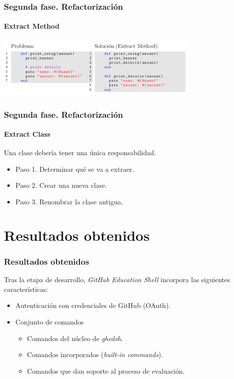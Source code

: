 \documentclass{beamer}
\begin{document}
\begin{frame}
  \frametitle{Segunda fase. Refactorización}
  \framesubtitle{Extract Method}

  \centering
  \includegraphics[height=3cm, width=10cm]{img/extract-method-example.png}
\end{frame}

\begin{frame}
  \frametitle{Segunda fase. Refactorización}
  \framesubtitle{Extract Class}

  Una clase debería tener una única responsabilidad.
  \bigskip

  \begin{itemize}
    \item Paso 1. Determinar qué se va a extraer.
    \item Paso 2. Crear una nueva clase.
    \item Paso 3. Renombrar la clase antigua.
  \end{itemize}
\end{frame}

\section{Resultados obtenidos}
\begin{frame}
\frametitle{Resultados obtenidos}
  Tras la etapa de desarrollo, {\it GitHub Education Shell} incorpora las siguientes características:
  \begin{itemize}
    \item Autenticación con credenciales de GitHub (OAuth).
    \item Conjunto de comandos
    \begin{itemize}
      \item Comandos del núcleo de {\it ghedsh}.
      \item Comandos incorporados ({\it built-in commands}).
      \item Comandos que dan soporte al proceso de evaluación.
    \end{itemize}
  \end{itemize}
\end{frame}
\end{document}

